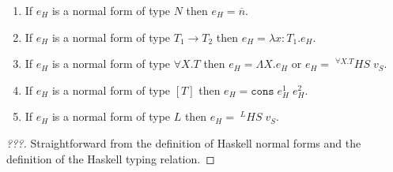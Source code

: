 \begin{hcf}
\label{hcf}
\begin{enumerate}
\item If $e_{H}$ is a normal form of type $N$ then $e_{H}=\overline{n}$.
\item If $e_{H}$ is a normal form of type $T_{1}\rightarrow T_{2}$ then $e_{H}=\lambda x:T_{1}.e_{H}$.
\item If $e_{H}$ is a normal form of type $\forall X.T$ then $e_{H}=\Lambda X.e_{H}$ or $e_{H}=\;^{\forall X.T}HS\;v_{S}$.
\item If $e_{H}$ is a normal form of type $[T]$ then $e_{H}=\mathtt{cons}\;e_{H}^{1}\;e_{H}^{2}$.
\item If $e_{H}$ is a normal form of type $L$ then $e_{H}=\;^{L}HS\;v_{S}$.
\end{enumerate}
\begin{proof}
[???] Straightforward from the definition of Haskell normal forms and the definition of the Haskell typing relation.
\end{proof}
\end{hcf}